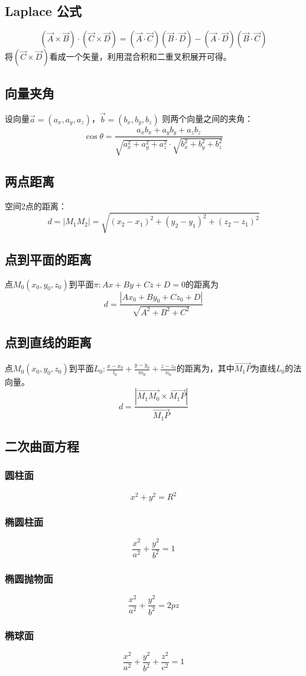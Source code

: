 \subsection{Laplace 公式}
\[(\vec{A}\times\vec{B})\cdot(\vec{C}\times\vec{D})=(\vec{A}\cdot\vec{C})(\vec{B}\cdot\vec{D})-(\vec{A}\cdot\vec{D})(\vec{B}\cdot\vec{C})\]
将$(\vec{C}\times\vec{D})$看成一个矢量，利用混合积和二重叉积展开可得。
\subsection{向量夹角}
设向量$\vec{a}=(a_x,a_y,a_z)$，$\vec{b}=(b_x,b_y,b_z)$
则两个向量之间的夹角：
\[\cos \theta=\frac{a_xb_x+a_yb_y+a_zb_z}{\sqrt{a_x^2+a_y^2+a_z^2}\cdot\sqrt{b_x^2+b_y^2+b_z^2}}\]
\subsection{两点距离}
空间2点的距离：
\[d=|M_1M_2|=\sqrt{(x_2-x_1)^2+(y_2-y_1)^2+(z_2-z_1)^2}\]
\subsection{点到平面的距离}
点$M_0(x_0,y_0,z_0)$到平面$\pi:Ax+By+Cz+D=0$的距离为
\[d=\frac{|Ax_0+By_0+Cz_0+D|}{\sqrt{A^2+B^2+C^2}}\]
\subsection{点到直线的距离}
点$M_0(x_0,y_0,z_0)$到平面$L_0:\frac{x-x_0}{l_0}+\frac{y-y_0}{m_0}+\frac{z-z_0}{n_0}$的距离为，其中$\overrightarrow{M_1P}$为直线$L_0$的法向量。
\[d=\frac{|\overrightarrow{M_1M_0}\times\overrightarrow{M_1P}|}{\overrightarrow{M_1P}}\]
\subsection{二次曲面方程}
\subsubsection{圆柱面}
\[x^2+y^2=R^2\]
\subsubsection{椭圆柱面}
\[\frac{x^2}{a^2}+\frac{y^2}{b^2}=1\]
\subsubsection{椭圆抛物面}
\[\frac{x^2}{a^2}+\frac{y^2}{b^2}=2pz\]
\subsubsection{椭球面}
\[\frac{x^2}{a^2}+\frac{y^2}{b^2}+\frac{z^2}{c^2}=1\]
